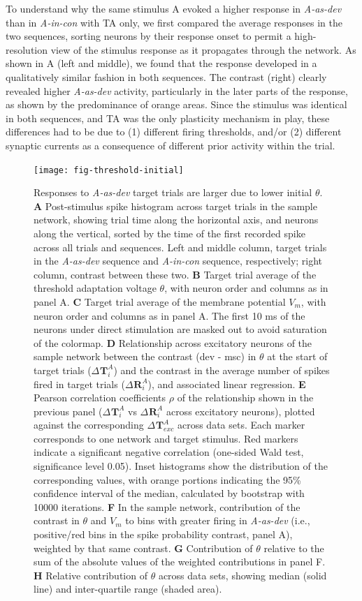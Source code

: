 \documentclass[9pt,lineno,onehalfspacing]{elife}
\newcommand{\dev}{\textit{A-as-dev}}
\newcommand{\msc}{\textit{A-in-con}}
\newcommand{\R}[3][]{{}^{#1}_{}\boldsymbol R^{#2}_{#3}}
\newcommand{\T}[3][]{{}^{#1}_{}\boldsymbol T^{#2}_{#3}}
\begin{document}
To understand why the same stimulus A evoked a higher response in \dev{} than in \msc{} with TA only, we first compared the average responses in the two sequences, sorting neurons by their response onset to permit a high-resolution view of the stimulus response as it propagates through the network. As shown in A (left and middle), we found that the response developed in a qualitatively similar fashion in both sequences. The contrast (right) clearly revealed higher \dev{} activity, particularly in the later parts of the response, as shown by the predominance of orange areas. Since the stimulus was identical in both sequences, and TA was the only plasticity mechanism in play, these differences had to be due to (1) different firing thresholds, and/or (2) different synaptic currents as a consequence of different prior activity within the trial.

\begin{figure}
    \texttt{[image: fig-threshold-initial]}
    \caption{%
        Responses to \dev{} target trials are larger due to lower initial $\theta$.
        \textbf{A} Post-stimulus spike histogram across target trials in the sample network, showing trial time along the horizontal axis, and neurons along the vertical, sorted by the time of the first recorded spike across all trials and sequences. Left and middle column, target trials in the \dev{} sequence and \msc{} sequence, respectively; right column, contrast between these two.
        \textbf{B} Target trial average of the threshold adaptation voltage $\theta$, with neuron order and columns as in panel A.
        \textbf{C} Target trial average of the membrane potential $V_m$, with neuron order and columns as in panel A. The first 10 ms of the neurons under direct stimulation are masked out to avoid saturation of the colormap.
        \textbf{D} Relationship across excitatory neurons of the sample network between the contrast (dev - msc) in $\theta$ at the start of target trials ($\Delta \T{A}{i}$) and the contrast in the average number of spikes fired in target trials ($\Delta \R{A}{i}$), and associated linear regression.
        \textbf{E} Pearson correlation coefficients $\rho$ of the relationship shown in the previous panel ($\Delta \T{A}{i}$ vs $\Delta \R{A}{i}$ across excitatory neurons), plotted against the corresponding $\Delta \T{A}{exc}$ across data sets. Each marker corresponds to one network and target stimulus. Red markers indicate a significant negative correlation (one-sided Wald test, significance level 0.05). Inset histograms show the distribution of the corresponding values, with orange portions indicating the 95\% confidence interval of the median, calculated by bootstrap with 10000 iterations.
        \textbf{F} In the sample network, contribution of the contrast in $\theta$ and $V_m$ to bins with greater firing in \dev{} (i.e., positive/red bins in the spike probability contrast, panel A), weighted by that same contrast.
        \textbf{G} Contribution of $\theta$ relative to the sum of the absolute values of the weighted contributions in panel F.
        \textbf{H} Relative contribution of $\theta$ across data sets, showing median (solid line) and inter-quartile range (shaded area).
    }
    \label{fig:threshold-initial}
\end{figure}
\end{document}
